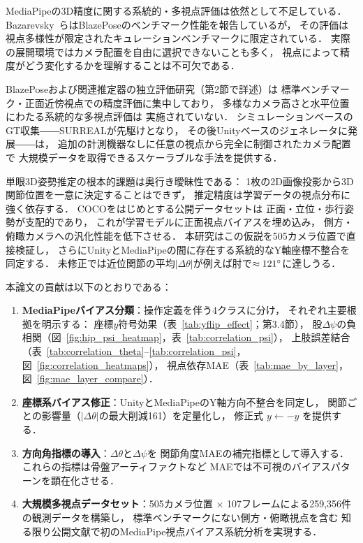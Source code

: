 \documentclass[twocolumn]{article}
\begin{document}
MediaPipeの3D精度に関する系統的・多視点評価は依然として不足している．
Bazarevsky~ら\cite{blazepose}はBlazePoseのベンチマーク性能を報告しているが，
その評価は視点多様性が限定されたキュレーションベンチマークに限定されている．
実際の展開環境ではカメラ配置を自由に選択できないことも多く，
視点によって精度がどう変化するかを理解することは不可欠である．

BlazePoseおよび関連推定器の独立評価研究（第2節で詳述）は
標準ベンチマーク・正面近傍視点での精度評価に集中しており，
多様なカメラ高さと水平位置にわたる系統的な多視点評価は
実施されていない．
シミュレーションベースのGT収集――SURREAL\cite{surreal}が先駆けとなり，
その後Unityベースのジェネレータ\cite{peoplesanspeople}に発展――は，
追加の計測機器なしに任意の視点から完全に制御されたカメラ配置で
大規模データを取得できるスケーラブルな手法を提供する．

単眼3D姿勢推定の根本的課題は奥行き曖昧性である：
1枚の2D画像投影から3D関節位置を一意に決定することはできず，
推定精度は学習データの視点分布に強く依存する\cite{mehta2017}．
COCO\cite{coco}をはじめとする公開データセットは
正面・立位・歩行姿勢が支配的であり，
これが学習モデルに正面視点バイアスを埋め込み，
側方・俯瞰カメラへの汎化性能を低下させる．
本研究はこの仮説を505カメラ位置で直接検証し，
さらにUnityとMediaPipeの間に存在する系統的なY軸座標不整合を同定する．
未修正では近位関節の平均$|\Delta\theta|$が例えば肘で$\approx121\degree{}$に達しうる．

本論文の貢献は以下のとおりである：
\begin{enumerate}\itemsep0pt
  \item \textbf{MediaPipeバイアス分類}：操作定義を伴う4クラスに分け，
        それぞれ主要根拠を明示する：
        座標$y$符号効果（表~\ref{tab:yflip_effect}；第3.4節），
        股$\Delta\psi$の負相関（図~\ref{fig:hip_psi_heatmap}，表~\ref{tab:correlation_psi}），
        上肢誤差結合（表~\ref{tab:correlation_theta}--\ref{tab:correlation_psi}，
        図~\ref{fig:correlation_heatmaps}），
        視点依存MAE（表~\ref{tab:mae_by_layer}，図~\ref{fig:mae_layer_compare}）．
  \item \textbf{座標系バイアス修正}：UnityとMediaPipeのY軸方向不整合を同定し，
        関節ごとの影響量（$|\Delta\theta|$の最大削減161\degree{}）を定量化し，
        修正式 $y \leftarrow -y$ を提供する．
  \item \textbf{方向角指標の導入}：$\Delta\theta$と$\Delta\psi$を
        関節角度MAEの補完指標として導入する．
        これらの指標は骨盤アーティファクトなど
        MAEでは不可視のバイアスパターンを顕在化させる．
  \item \textbf{大規模多視点データセット}：505カメラ位置 $\times$
        107フレームによる259,356件の観測データを構築し，
        標準ベンチマークにない側方・俯瞰視点を含む
        知る限り公開文献で初のMediaPipe視点バイアス系統分析を実現する．
\end{enumerate}
\end{document}

